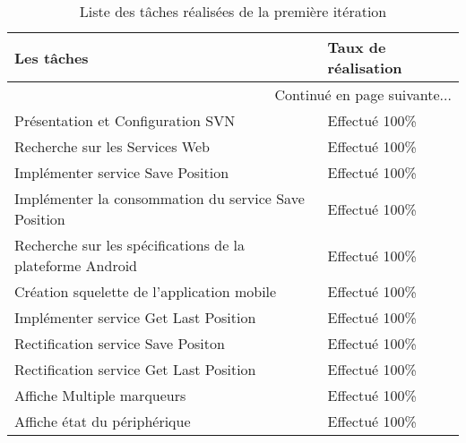 \begin{center}
    \begin{longtable}{| l | l |}
        \caption{Liste des tâches réalisées de la première itération}
        \label{tab:sprint1-estimation} \\

        \hline
        \textbf{Les tâches} & \textbf{Taux de réalisation} \\ \hline
        \endhead

        \hline \multicolumn{2}{|r|}{{Continué en page suivante$\dotsc$}} \\ \hline
        \endfoot

        \hline \hline
        \endlastfoot

        \hline
Présentation et Configuration SVN & Effectué 100\% \\ \hline
Recherche sur les Services Web & Effectué 100\% \\ \hline
Implémenter service Save Position & Effectué 100\% \\ \hline
Implémenter la consommation du service Save Position & Effectué 100\% \\ \hline
Recherche sur les spécifications de la plateforme Android & Effectué 100\% \\ \hline
Création squelette de l'application mobile & Effectué 100\% \\ \hline
Implémenter service Get Last Position &  Effectué 100\% \\ \hline
Rectification service Save Positon &  Effectué 100\% \\ \hline
Rectification service Get Last Position &  Effectué 100\% \\ \hline
Affiche Multiple marqueurs & Effectué 100\% \\ \hline
Affiche état du périphérique &  Effectué 100\% \\ \hline
    \end{longtable}
\end{center}

